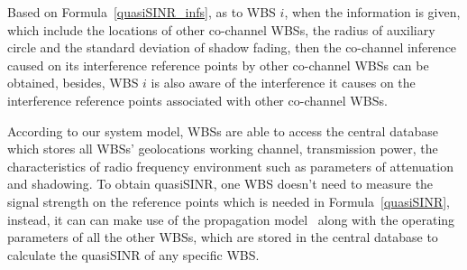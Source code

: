 


Based on Formula~\ref{quasiSINR_infs}, as to WBS $i$, when the information is given, which include the locations of other co-channel WBSs, the radius of auxiliary circle and the standard deviation of shadow fading, then the co-channel inference caused on its interference reference points by other co-channel WBSs can be obtained, besides, WBS $i$ is also aware of the interference it causes on the interference reference points associated with other co-channel WBSs.


According to our system model, WBSs are able to access the central database which stores all WBSs' geolocations \ie working channel, transmission power, the characteristics of radio frequency environment such as parameters of attenuation and shadowing.
To obtain quasiSINR, one WBS doesn't need to measure the signal strength on the reference points which is needed in Formula~\ref{quasiSINR}, instead, it can can make use of the propagation model~\cite{Jaentti11} along with the operating parameters of all the other WBSs, which are stored in the central database to calculate the quasiSINR of any specific WBS.



